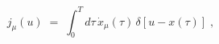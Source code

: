 \begin{equation}
j_\mu (u) \;=\; \int_0^T d\tau \, {\dot x}_\mu(\tau) \, \delta[u -
x(\tau)] \;,
\end{equation}

